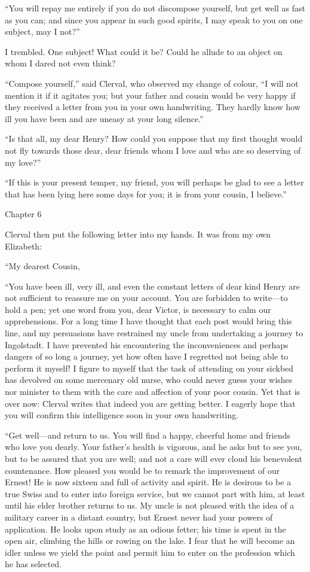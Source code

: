 \documentclass[12pt,openright]{book}
\begin{document}
“You will repay me entirely if you do not discompose yourself, but get well as fast as you can; and since you appear in such good spirits, I may speak to you on one subject, may I not?”

I trembled. One subject! What could it be? Could he allude to an object on whom I dared not even think?

“Compose yourself,” said Clerval, who observed my change of colour, “I will not mention it if it agitates you; but your father and cousin would be very happy if they received a letter from you in your own handwriting. They hardly know how ill you have been and are uneasy at your long silence.”

“Is that all, my dear Henry? How could you suppose that my first thought would not fly towards those dear, dear friends whom I love and who are so deserving of my love?”

“If this is your present temper, my friend, you will perhaps be glad to see a letter that has been lying here some days for you; it is from your cousin, I believe.”

Chapter 6

Clerval then put the following letter into my hands. It was from my own Elizabeth:

“My dearest Cousin,

“You have been ill, very ill, and even the constant letters of dear kind Henry are not sufficient to reassure me on your account. You are forbidden to write—to hold a pen; yet one word from you, dear Victor, is necessary to calm our apprehensions. For a long time I have thought that each post would bring this line, and my persuasions have restrained my uncle from undertaking a journey to Ingolstadt. I have prevented his encountering the inconveniences and perhaps dangers of so long a journey, yet how often have I regretted not being able to perform it myself! I figure to myself that the task of attending on your sickbed has devolved on some mercenary old nurse, who could never guess your wishes nor minister to them with the care and affection of your poor cousin. Yet that is over now: Clerval writes that indeed you are getting better. I eagerly hope that you will confirm this intelligence soon in your own handwriting.

“Get well—and return to us. You will find a happy, cheerful home and friends who love you dearly. Your father’s health is vigorous, and he asks but to see you, but to be assured that you are well; and not a care will ever cloud his benevolent countenance. How pleased you would be to remark the improvement of our Ernest! He is now sixteen and full of activity and spirit. He is desirous to be a true Swiss and to enter into foreign service, but we cannot part with him, at least until his elder brother returns to us. My uncle is not pleased with the idea of a military career in a distant country, but Ernest never had your powers of application. He looks upon study as an odious fetter; his time is spent in the open air, climbing the hills or rowing on the lake. I fear that he will become an idler unless we yield the point and permit him to enter on the profession which he has selected.
\end{document}
